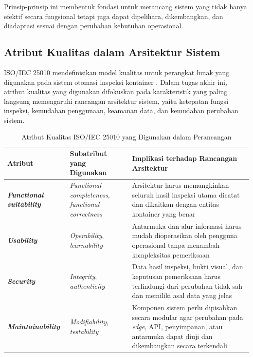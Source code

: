 Prinsip-prinsip ini membentuk fondasi untuk merancang sistem yang tidak hanya efektif secara fungsional tetapi juga dapat dipelihara, dikembangkan, dan diadaptasi sesuai dengan perubahan kebutuhan operasional.

\subsection{Atribut Kualitas dalam Arsitektur Sistem}

ISO/IEC 25010 mendefinisikan model kualitas untuk perangkat lunak yang
digunakan pada sistem otomasi inspeksi kontainer \autocite{iso25010}.
Dalam tugas akhir ini, atribut kualitas yang digunakan difokuskan pada
karakteristik yang paling langsung memengaruhi rancangan arsitektur sistem,
yaitu ketepatan fungsi inspeksi, kemudahan penggunaan, keamanan data, dan
kemudahan perubahan sistem.

\begin{table}[ht]
  \centering
  \small
  \caption{Atribut Kualitas ISO/IEC 25010 yang Digunakan dalam Perancangan}
  \label{tbl:quality_attributes}
  \begin{tabular}{p{} p{} p{}}
    \toprule
    \textbf{Atribut} & \textbf{Subatribut yang Digunakan} & \textbf{Implikasi terhadap Rancangan Arsitektur} \\
    \midrule
    \textbf{\textit{Functional suitability}} & \textit{Functional completeness}, \textit{functional correctness} & Arsitektur harus memungkinkan seluruh hasil inspeksi utama dicatat dan dikaitkan dengan entitas kontainer yang benar \\
    \textbf{\textit{Usability}} & \textit{Operability}, \textit{learnability} & Antarmuka dan alur informasi harus mudah dioperasikan oleh pengguna operasional tanpa menambah kompleksitas pemeriksaan \\
    \textbf{\textit{Security}} & \textit{Integrity}, \textit{authenticity} & Data hasil inspeksi, bukti visual, dan keputusan pemeriksaan harus terlindungi dari perubahan tidak sah dan memiliki asal data yang jelas \\
    \textbf{\textit{Maintainability}} & \textit{Modifiability}, \textit{testability} & Komponen sistem perlu dipisahkan secara modular agar perubahan pada \textit{edge}, API, penyimpanan, atau antarmuka dapat diuji dan dikembangkan secara terkendali \\
    \bottomrule
  \end{tabular}
\end{table}

